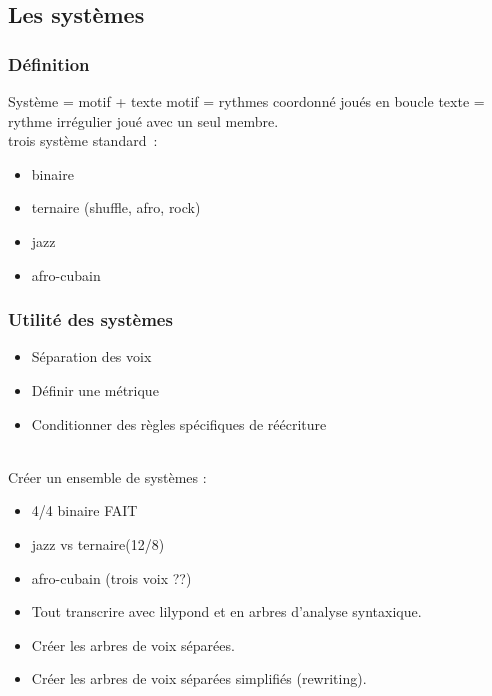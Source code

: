 \subsection{Les systèmes}
\subsubsection{Définition}

Système = motif + texte
motif = rythmes coordonné joués en boucle
texte = rythme irrégulier joué avec un seul membre.\\

trois système standard :
\begin{itemize}
	\item binaire
	\item ternaire (shuffle, afro, rock)
	\item jazz
	\item afro-cubain
\end{itemize}

\subsubsection{Utilité des systèmes}
\begin{itemize}
	\item Séparation des voix
	\item Définir une métrique
	\item Conditionner des règles spécifiques de réécriture
\end{itemize}
\ \\
Créer un ensemble de systèmes :
\begin{itemize}
	\item 4/4 binaire FAIT
	\item jazz vs ternaire(12/8)
	\item afro-cubain (trois voix ??)
	\item Tout transcrire avec lilypond et en arbres d’analyse syntaxique.
	\item Créer les arbres de voix séparées.
	\item Créer les arbres de voix séparées simplifiés (rewriting).\\	
\end{itemize}

